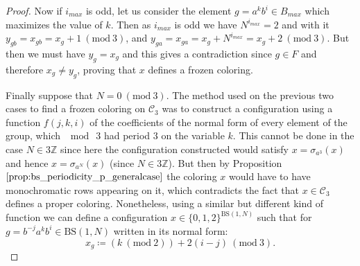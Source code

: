 \documentclass[letterpaper,10pt]{amsart}
\theoremstyle{plain}
\newcommand{\BS}[1][N]{\mathrm{BS}(1,#1)}
\begin{document}
\begin{proof}
	Now if $i_{max}$ is odd, let us consider the element $g=a^kb^i\in B_{max}$ which maximizes the value of $k$. Then as $i_{max}$ is odd we have $N^{i_{max}}=2$ and with it $y_{gb}=x_{gb}=x_g+1  \ (\mathrm{mod} \ 3)$, and $y_{ga}=x_{ga}=x_g+N^{i_{max}} = x_g+2  \ (\mathrm{mod} \ 3)$. But then we must have $y_g=x_g$ and this gives a contradiction since $g\in F$ and therefore $x_g\neq y_g$, proving that $x$ defines a frozen coloring.
	
	
	Finally suppose that $N=0 \ (\mathrm{mod} \ 3)$. The method used on the previous two cases to find a frozen coloring on $\mathcal{C}_3$ was to construct a configuration using a function $f(j,k,i)$ of the coefficients of the normal form of every element of the group, which $\mod \ 3$ had period $3$ on the variable $k$. This cannot be done in the case $N\in 3\mathbb{Z }$ since here the configuration constructed would satisfy $x=\sigma_{a^3}(x)$ and hence $x=\sigma_{a^N}(x)$ (since $N\in 3\mathbb{Z}$). But then by Proposition $\ref{prop:bs_periodicity_p_generalcase}$ the coloring $x$ would have to have monochromatic rows appearing on it, which contradicts the fact that $x\in \mathcal{C}_3$ defines a proper coloring. Nonetheless, using a similar but different kind of function we can define a configuration $x\in \{0,1,2\}^{\BS}$ such that for $g=b^{-j}a^k b^i\in \BS$ written in its normal form:
	$$
	x_g\coloneqq (k \ (\mathrm{mod} \ 2)) + 2(i-j) \ (\mathrm{mod} \ 3).
	$$
	

\end{proof}
\end{document}

